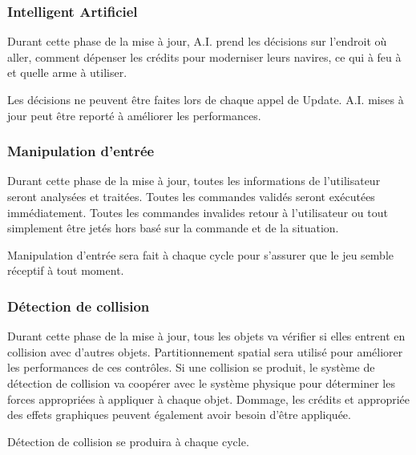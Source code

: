 
\subsubsection{Intelligent Artificiel } %
\label{ssub:a_i_décisions_}
Durant cette phase de la mise à jour, A.I. prend les décisions sur l'endroit où aller, comment dépenser les crédits pour moderniser leurs navires, ce qui à feu à et quelle arme à utiliser. 

Les décisions ne peuvent être faites lors de chaque appel de Update. A.I. mises à jour peut être reporté à améliorer les performances.


\subsubsection{Manipulation d'entrée} %
\label{ssub:manipulation_d_entrée}

Durant cette phase de la mise à jour, toutes les informations de l'utilisateur seront analysées et traitées. Toutes les commandes validés seront exécutées immédiatement. Toutes les commandes invalides retour à l'utilisateur ou tout simplement être jetés hors basé sur la commande et de la situation. 

Manipulation d'entrée sera fait à chaque cycle  pour s'assurer que le jeu semble réceptif à tout moment.


\subsubsection{Détection de collision} %
\label{ssub:détection_de_collision}

Durant cette phase de la mise à jour, tous les objets va vérifier si elles entrent en collision avec d'autres objets. Partitionnement spatial sera utilisé pour améliorer les performances de ces contrôles. Si une collision se produit, le système de détection de collision va coopérer avec le système physique pour déterminer les forces appropriées à appliquer à chaque objet. Dommage, les crédits et appropriée des effets graphiques peuvent également avoir besoin d'être appliquée. 

Détection de collision se produira à chaque cycle.


